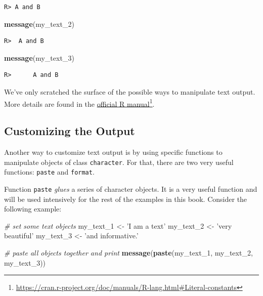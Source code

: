 \documentclass[
  12pt,
]{book}
\newenvironment{Shaded}{\begin{snugshade}}{\end{snugshade}}
\newcommand{\CommentTok}[1]{\textcolor[rgb]{0.37,0.37,0.37}{\textit{#1}}}
\newcommand{\DecValTok}[1]{\textcolor[rgb]{0.06,0.06,0.06}{#1}}
\newcommand{\KeywordTok}[1]{\textcolor[rgb]{0.27,0.27,0.27}{\textbf{#1}}}
\newcommand{\NormalTok}[1]{#1}
\newcommand{\StringTok}[1]{\textcolor[rgb]{0.5,0.5,0.5}{#1}}
\begin{document}
\begin{verbatim}
R> A and B
\end{verbatim}

\begin{Shaded}
\begin{Highlighting}[]
\KeywordTok{message}\NormalTok{(my_text_}\DecValTok{2}\NormalTok{)}
\end{Highlighting}
\end{Shaded}

\begin{verbatim}
R>  A and B
\end{verbatim}

\begin{Shaded}
\begin{Highlighting}[]
\KeywordTok{message}\NormalTok{(my_text_}\DecValTok{3}\NormalTok{)}
\end{Highlighting}
\end{Shaded}

\begin{verbatim}
R>      A and B
\end{verbatim}

We've only scratched the surface of the possible ways to manipulate text output. More details are found in the \href{https://cran.r-project.org/doc/manuals/R-lang.html\#Literal-constants}{official R manual}\footnote{\url{https://cran.r-project.org/doc/manuals/R-lang.html\#Literal-constants}}.

\hypertarget{customizing-the-output}{%
\subsection{Customizing the Output}\label{customizing-the-output}}

Another way to customize text output is by using specific functions to manipulate objects of class \texttt{character}. For that, there are two very useful functions: \texttt{paste} and \texttt{format}.  

Function \texttt{paste} \emph{glues} a series of character objects. It is a very useful function and will be used intensively for the rest of the examples in this book. Consider the following example:

\begin{Shaded}
\begin{Highlighting}[]
\CommentTok{# set some text objects}
\NormalTok{my_text_}\DecValTok{1}\NormalTok{ <-}\StringTok{ 'I am a text'}
\NormalTok{my_text_}\DecValTok{2}\NormalTok{ <-}\StringTok{ 'very beautiful'}
\NormalTok{my_text_}\DecValTok{3}\NormalTok{ <-}\StringTok{ 'and informative.'}

\CommentTok{# paste all objects together and print}
\KeywordTok{message}\NormalTok{(}\KeywordTok{paste}\NormalTok{(my_text_}\DecValTok{1}\NormalTok{, my_text_}\DecValTok{2}\NormalTok{, my_text_}\DecValTok{3}\NormalTok{))}
\end{Highlighting}
\end{Shaded}
\end{document}
